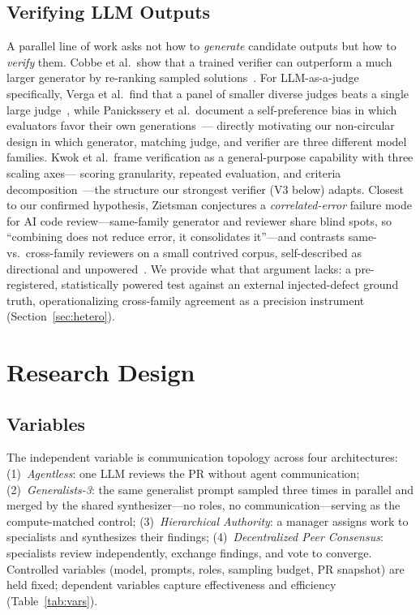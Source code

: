 \documentclass[conference]{IEEEtran}
\begin{document}
\subsection{Verifying LLM Outputs}
A parallel line of work asks not how to \emph{generate} candidate outputs
but how to \emph{verify} them. Cobbe et al.\ show that a trained verifier can
outperform a much larger generator by re-ranking sampled
solutions~\cite{cobbe}. For LLM-as-a-judge specifically, Verga et al.\ find
that a panel of smaller diverse judges beats a single large
judge~\cite{verga}, while Panickssery et al.\ document a self-preference
bias in which evaluators favor their own generations~\cite{panickssery}---
directly motivating our non-circular design in which generator, matching
judge, and verifier are three different model families. Kwok et al.\ frame
verification as a general-purpose capability with three scaling axes---
scoring granularity, repeated evaluation, and criteria
decomposition~\cite{kwok}---the structure our strongest verifier (V3 below)
adapts. Closest to our confirmed hypothesis, Zietsman conjectures a
\emph{correlated-error} failure mode for AI code review---same-family
generator and reviewer share blind spots, so ``combining does not reduce
error, it consolidates it''---and contrasts same- vs.\ cross-family
reviewers on a small contrived corpus, self-described as directional and
unpowered~\cite{zietsman}. We provide what that argument lacks: a
pre-registered, statistically powered test against an external
injected-defect ground truth, operationalizing cross-family agreement as
a precision instrument (Section~\ref{sec:hetero}).

\section{Research Design}

\subsection{Variables}
\label{sec:variables}
The independent variable is communication topology across four
architectures: (1)~\emph{Agentless}: one LLM reviews the PR without agent
communication; (2)~\emph{Generalists-3}: the same generalist prompt sampled
three times in parallel and merged by the shared synthesizer---no roles, no
communication---serving as the compute-matched control; (3)~\emph{Hierarchical
Authority}: a manager assigns work to specialists and synthesizes their
findings; (4)~\emph{Decentralized Peer Consensus}: specialists review
independently, exchange findings, and vote to converge. Controlled variables
(model, prompts, roles, sampling budget, PR snapshot) are held fixed;
dependent variables capture effectiveness and efficiency (Table~\ref{tab:vars}).
\end{document}
